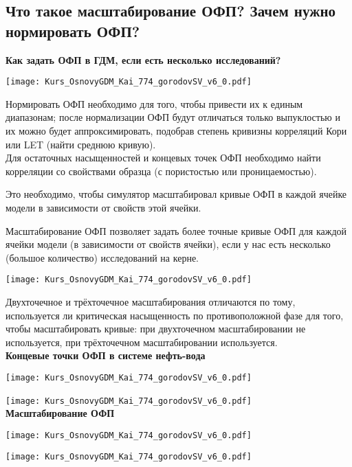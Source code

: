 

\subsection{Что такое масштабирование ОФП? Зачем нужно нормировать ОФП?}

\textbf{Как задать ОФП в ГДМ, если есть несколько исследований?}

\texttt{[image: Kurs\_OsnovyGDM\_Kai\_774\_gorodovSV\_v6\_0.pdf]}

Нормировать ОФП необходимо для того, чтобы привести их к единым диапазонам; после нормализации ОФП будут отличаться только выпуклостью и их можно будет аппроксимировать, подобрав степень кривизны корреляций Кори или LET (найти среднюю кривую).
\\

Для остаточных насыщенностей и концевых точек ОФП необходимо найти корреляции со свойствами образца (с пористостью или проницаемостью).

Это необходимо, чтобы симулятор масштабировал кривые ОФП в каждой ячейке модели в зависимости от свойств этой ячейки.

Масштабирование ОФП позволяет задать более точные кривые ОФП для каждой ячейки модели (в зависимости от свойств ячейки), если у нас есть несколько (большое количество) исследований на керне.

\texttt{[image: Kurs\_OsnovyGDM\_Kai\_774\_gorodovSV\_v6\_0.pdf]}

Двухточечное и трёхточечное масштабирования отличаются по тому, используется ли критическая насыщенность по противоположной фазе для того, чтобы масштабировать кривые: при двухточечном масштабировании не используется, при трёхточечном масштабировании используется.
\\

\textbf{Концевые точки ОФП в системе нефть-вода}

\texttt{[image: Kurs\_OsnovyGDM\_Kai\_774\_gorodovSV\_v6\_0.pdf]}

\texttt{[image: Kurs\_OsnovyGDM\_Kai\_774\_gorodovSV\_v6\_0.pdf]}
\ \\

\textbf{Масштабирование ОФП}

\texttt{[image: Kurs\_OsnovyGDM\_Kai\_774\_gorodovSV\_v6\_0.pdf]}

\texttt{[image: Kurs\_OsnovyGDM\_Kai\_774\_gorodovSV\_v6\_0.pdf]}

